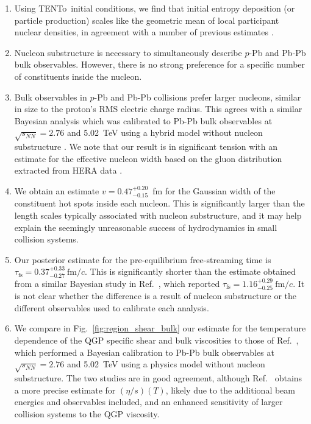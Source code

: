 \documentclass[aps,prc,reprint,amsmath,nofootinbib]{revtex4-1}
\newcommand{\trento}{T\raisebox{-0.5ex}{R}ENTo}
\newcommand{\sqrts}{\sqrt{s_{NN}}}
\newcommand{\fmc}{\ensuremath{\text{fm}/c}}
\newcommand{\taufs}{\tau_\text{fs}}
\begin{document}
\begin{enumerate}[itemsep=0pt, leftmargin=2\parindent]
  \item
    Using \trento\ initial conditions, we find that initial entropy deposition (or particle production) scales like the geometric mean of local participant nuclear densities, in agreement with a number of previous estimates \cite{Moreland:2014oya, Bernhard:2016tnd, Bernhard:2018hnz}.
  \item
    Nucleon substructure is necessary to simultaneously describe $p$-Pb and Pb-Pb bulk observables. However, there is no strong preference for a specific number of constituents inside the nucleon.
  \item
    Bulk observables in $p$-Pb and Pb-Pb collisions prefer larger nucleons, similar in size to the proton's RMS electric charge radius.
    This agrees with a similar Bayesian analysis which was calibrated to Pb-Pb bulk observables at $\sqrts=2.76$ and 5.02~TeV using a hybrid model without nucleon substructure \cite{Bernhard:2018hnz}.
    We note that our result is in significant tension with an estimate for the effective nucleon width based on the gluon distribution extracted from HERA data \cite{Rezaeian:2012ji}.
  \item
    We obtain an estimate $v=0.47_{-0.15}^{+0.20}$~fm for the Gaussian width of the constituent hot spots inside each nucleon.
    This is significantly larger than the length scales typically associated with nucleon substructure, and it may help explain the seemingly unreasonable success of hydrodynamics in small collision systems.
  \item
    Our posterior estimate for the pre-equilibrium free-streaming time is $\taufs=0.37_{-0.27}^{+0.33}\ \fmc$.
    This is significantly shorter than the estimate obtained from a similar Bayesian study in Ref.~\cite{Bernhard:2018hnz}, which reported $\taufs=1.16_{-0.25}^{+0.29}\ \fmc$.
    It is not clear whether the difference is a result of nucleon substructure or the different observables used to calibrate each analysis.
  \item
    We compare in Fig.~\ref{fig:region_shear_bulk} our estimate for the temperature dependence of the QGP specific shear and bulk viscosities to those of Ref.~\cite{Bernhard:2018hnz}, which performed a Bayesian calibration to Pb-Pb bulk observables at $\sqrts=2.76$ and 5.02~TeV using a physics model without nucleon substructure.
    The two studies are in good agreement, although Ref.~\cite{Bernhard:2018hnz} obtains a more precise estimate for $(\eta/s)(T)$, likely due to the additional beam energies and observables included, and an enhanced sensitivity of larger collision systems to the QGP viscosity.

\end{enumerate}
\end{document}
